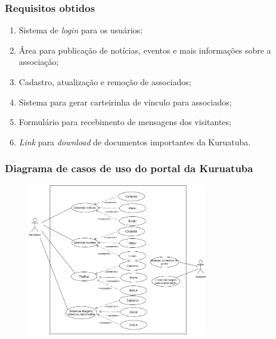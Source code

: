 \documentclass{beamer}
\begin{document}
\begin{frame}
    \frametitle{Requisitos obtidos} %
    \begin{enumerate}
     \item Sistema de \textit{login} para os usuários;
     \item Área para publicação de notícias, eventos e mais informações sobre a associação;
     \item Cadastro, atualização e remoção de associados;
     \item Sistema para gerar carteirinha de vínculo para associados;
     \item Formulário para recebimento de mensagens dos visitantes;
     \item \textit{Link} para \textit{download} de documentos importantes da Kuruatuba.
    \end{enumerate}

\end{frame}


\begin{frame}
    \frametitle{Diagrama de casos de uso do portal da Kuruatuba}
    \begin{figure}[htb]
        \centering
        
        \includegraphics[width=0.7\textwidth]{figuras/use-case-portal-1.png}
        
        \label{use-case-portal}
    \end{figure}
\end{frame}
\end{document}
